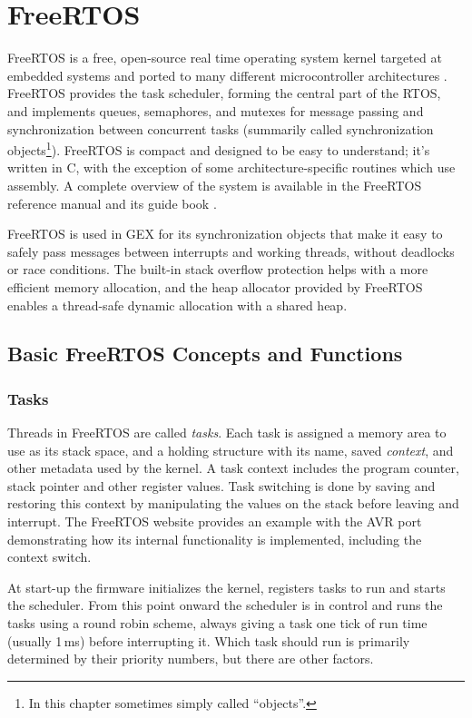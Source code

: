 \chapter{FreeRTOS} \label{sec:freertos}

FreeRTOS is a free, open-source real time operating system kernel targeted at embedded systems and ported to many different microcontroller architectures \cite{freertos-ports-list}. FreeRTOS provides the task scheduler, forming the central part of the RTOS, and implements queues, semaphores, and mutexes for message passing and synchronization between concurrent tasks (summarily called synchronization objects\footnote{In this chapter sometimes simply called ``objects''.}). FreeRTOS is compact and designed to be easy to understand; it's written in C, with the exception of some architecture-specific routines which use assembly. A complete overview of the system is available in the FreeRTOS reference manual \cite{freertos-rm} and its guide book \cite{freertos-book}.

FreeRTOS is used in GEX for its synchronization objects that make it easy to safely pass messages between interrupts and working threads, without deadlocks or race conditions. The built-in stack overflow protection helps with a more efficient memory allocation, and the heap allocator provided by FreeRTOS enables a thread-safe dynamic allocation with a shared heap.

\section{Basic FreeRTOS Concepts and Functions}

\subsection{Tasks}

Threads in FreeRTOS are called \textit{tasks}. Each task is assigned a memory area to use as its stack space, and a holding structure with its name, saved \textit{context}, and other metadata used by the kernel. A task context includes the program counter, stack pointer and other register values. Task switching is done by saving and restoring this context by manipulating the values on the stack before leaving and interrupt. The FreeRTOS website provides an example with the AVR port \cite{freertos-task-switching} demonstrating how its internal functionality is implemented, including the context switch.

At start-up the firmware initializes the kernel, registers tasks to run and starts the scheduler. From this point onward the scheduler is in control and runs the tasks using a round robin scheme, always giving a task one tick of run time (usually 1\,ms) before interrupting it. Which task should run is primarily determined by their priority numbers, but there are other factors.

